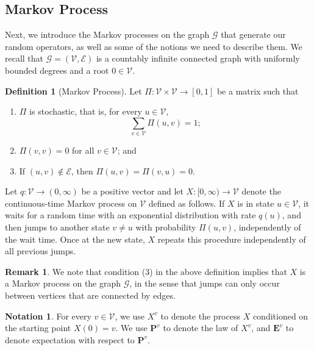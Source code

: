 \documentclass{amsart}
\numberwithin{equation}{section}
\theoremstyle{definition}
\newtheorem{definition}[theorem]{Definition}
\newtheorem{notation}[theorem]{Notation}
\newtheorem{remark}[theorem]{Remark}
\newcommand\mbf{\mathbf}
\newcommand\ms{\mathscr}
\begin{document}
%

\subsection{Markov Process}

%

Next, we introduce the Markov processes on the graph
$\ms G$ that generate
our random operators, as well as some of the notions we
need to describe them. We recall that $\ms G=(\ms V,\ms E)$ is a countably infinite
connected graph with uniformly bounded degrees and a root $0\in\ms V$. 

%

\begin{definition}[Markov Process]
Let $\Pi:\ms V\times\ms V\to[0,1]$ be a matrix such that
\begin{enumerate}
\item $\Pi$ is stochastic, that is, for every $u\in \ms V$,
\[\sum_{v\in\ms V}\Pi(u,v)=1;\]
\item $\Pi(v,v)=0$ for all $v\in\ms V$; and
\item If $(u,v)\not\in\ms E$, then $\Pi(u,v)=\Pi(v,u)=0$.
\end{enumerate}
Let $q:\ms V\to(0,\infty)$ be a positive vector and let
$X:[0,\infty)\to\ms V$ denote the continuous-time Markov process on $\ms V$
defined as follows. If $X$ is in
state $u\in\ms V$, it waits for a random time with
an exponential distribution with rate $q(u)$, and then jumps
to another state $v\neq u$ with probability $\Pi(u,v)$, independently of the wait time.
Once at the new state, $X$ repeats this procedure independently of all previous jumps.
\end{definition}

%

\begin{remark}
We note that condition (3) in the above definition implies that
$X$ is a Markov process on the graph $\ms G$, in the sense that
jumps can only occur between vertices that are connected by edges.
\end{remark}

%

\begin{notation}
\label{Notation: Markov Probability and Expectation}
For every $v\in\ms V$, we use
$X^v$ to denote the process $X$
conditioned on the starting point $X(0)=v$.
We use $\mbf P^v$ to denote the
law of $X^v$, and $\mbf E^v$ to denote expectation
with respect to $\mbf P^v$.
\end{notation}
\end{document}
